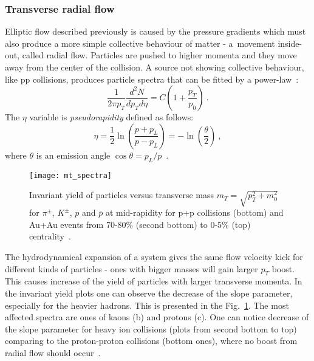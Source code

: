       \subsubsection{Transverse radial flow}
        Elliptic flow described previously is caused by the pressure gradients which must also produce a more simple collective behaviour of matter - a~movement inside-out, called radial flow.
        Particles are pushed to higher momenta and they move away from the center of the collision.
        A source not showing collective behaviour, like pp collisions, produces particle spectra that can be fitted by a power-law~\cite{drkisiel}:
        \begin{equation}
          \frac{1}{2\pi p_T} \frac{d^2 N}{d p_T d \eta} = C \left( 1 +\frac{p_T}{p_0} \right)~.
        \end{equation}
        The $\eta$ variable is \textit{pseudorapidity} defined as follows:
        \begin{equation}
          \eta = \frac{1}{2} \ln \left( \frac{p + p_L}{p - p_L} \right) = -\ln \left(\frac{\theta}{2} \right)~,
        \end{equation}
        where $\theta$ is an emission angle $\cos \theta = p_L / p$~.
        \begin{figure}[h]
          \centering
          \texttt{[image: mt\_spectra]}
          \caption{Invariant yield of particles versus transverse mass $m_T = \sqrt{p^2_T + m_0^2}$ for $\pi^{\pm}$, $K^{\pm}$, $p$ and $\bar{p}$ at mid-rapidity for p+p collisions (bottom) and Au+Au events from 70-80\% (second bottom) to 0-5\% (top) centrality~\cite{mtspectra}.}
          \label{fig:invariant_yield}
        \end{figure}

        The hydrodynamical expansion of a system gives the same flow velocity kick for different kinds of particles - ones with bigger masses will gain larger $p_T$ boost.
        This causes increase of the yield of particles with larger transverse momenta.
        In the invariant yield plots one can observe the decrease of the slope parameter, especially for the heavier hadrons.
        This is presented in the Fig.~\ref{fig:invariant_yield}.
        The most affected spectra are ones of kaons (b) and protons (c).
        One can notice decrease of the slope parameter for heavy ion collisions (plots from second bottom to top) comparing to the proton-proton collisions (bottom ones), where no boost from radial flow should occur~\cite{drkisiel}.


